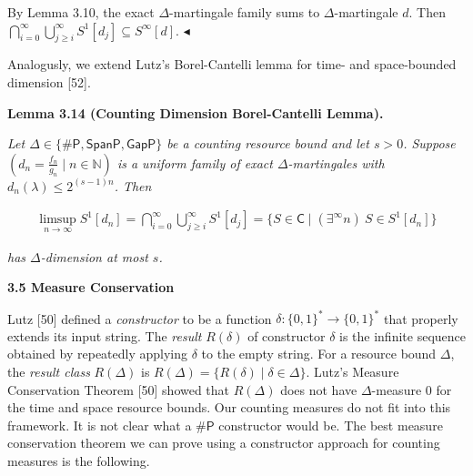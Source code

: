 \documentclass[10pt,a4paper]{article}
\begin{document}
By Lemma 3.10, the exact $\Delta$-martingale family sums to $\Delta$-martingale $d$. Then $\bigcap\limits_{i=0}^{\infty}\bigcup\limits_{j\geq i}^{\infty}S^{1}[d_{j}]\subseteq S^{\infty}[d]$.
$\blacktriangleleft$\par




Analogusly, we extend Lutz’s Borel-Cantelli lemma for time- and space-bounded dimension [52].\par





\par\medskip\noindent\textbf{
\textbf{Lemma 3.14}\textbf{ }(Counting Dimension Borel-Cantelli Lemma)\textbf{.}
}\par



\emph{Let $\Delta\in\{{\mathsf{\#}\mathsf{P}},\mathsf{SpanP},\mathsf{GapP}\}$ be a counting resource bound and let $s>0$.
Suppose $\left(d_{n}=\frac{f_{n}}{g_{n}}\mid n\in\mathbb{N}\right)$ is a uniform family of
exact $\Delta$-martingales with $d_{n}(\lambda)\leq 2^{(s-1)n}$.
Then}\par


\[\begin{gathered}
\limsup\limits_{n\to\infty}S^{1}[d_{n}]=\bigcap_{i=0}^{\infty}\bigcup_{j\geq i}^{\infty}S^{1}[d_{j}]=\{S\in\mathsf{C}\mid(\exists^{\infty}n)\ S\in S^{1}[d_{n}]\}
\end{gathered}\]


\emph{has $\Delta$-dimension at most $s$.}\par








\par\medskip\noindent\textbf{
3.5 Measure Conservation}\par




Lutz [50] defined a \emph{constructor} to be a function $\delta:\{0,1\}^{*}\to\{0,1\}^{*}$ that properly extends its input string. The \emph{result} $R(\delta)$ of constructor $\delta$ is the infinite sequence obtained by repeatedly applying $\delta$ to the empty string. For a resource bound $\Delta$, the \emph{result class} $R(\Delta)$ is $R(\Delta)=\{R(\delta)\mid\delta\in\Delta\}$.
Lutz’s Measure Conservation Theorem [50] showed that $R(\Delta)$ does not have $\Delta$-measure 0 for the time and space resource bounds. Our counting measures do not fit into this framework. It is not clear what a ${\mathsf{\#}\mathsf{P}}$ constructor would be. The best measure conservation theorem we can prove using a constructor approach for counting measures is the following.\par
\end{document}
